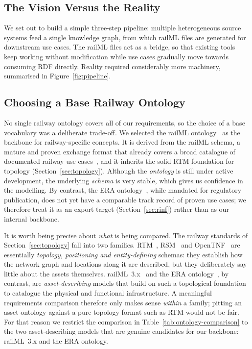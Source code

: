 \documentclass{ceurart}
\begin{document}
\subsection{The Vision Versus the Reality}

We set out to build a simple three-step pipeline: multiple heterogeneous source
systems feed a single knowledge graph, from which railML files are generated for
downstream use cases. The railML files act as a bridge, so that existing tools
keep working without modification while use cases gradually move towards
consuming RDF directly. Reality required considerably more machinery, summarised
in Figure~\ref{fig:pipeline}.

\subsection{Choosing a Base Railway Ontology}

No single railway ontology covers all of our requirements, so the choice of a
base vocabulary was a deliberate trade-off. We selected the railML
ontology~\cite{railmlontology} as the backbone for railway-specific concepts. It
is derived from the railML schema, a mature and proven exchange format that
already covers a broad catalogue of documented railway use
cases~\cite{railmlusecases}, and it inherits the solid RTM foundation for
topology (Section~\ref{sec:topology}). Although the \emph{ontology} is still
under active development, the underlying \emph{schema} is very stable, which
gives us confidence in the modelling. By contrast, the ERA
ontology~\cite{eraontology}, while mandated for regulatory publication, does not
yet have a comparable track record of proven use cases; we therefore treat it as
an export target (Section~\ref{sec:rinf}) rather than as our internal backbone.

It is worth being precise about \emph{what} is being compared. The railway
standards of Section~\ref{sec:topology} fall into two families. RTM~\cite{rtm},
RSM~\cite{rsm} and OpenTNF~\cite{opentnf} are essentially \emph{topology,
positioning and entity-defining} schemas: they establish how the network graph
and locations along it are described, but they deliberately say little about the
assets themselves. railML~3.x~\cite{railml} and the ERA
ontology~\cite{eraontology}, by contrast, are \emph{asset-describing} models that
build on such a topological foundation to catalogue the physical and functional
infrastructure. A meaningful requirements comparison therefore only makes sense
\emph{within} a family; pitting an asset ontology against a pure topology format
such as RTM would not be fair. For that reason we restrict the comparison in
Table~\ref{tab:ontology-comparison} to the two asset-describing models that are
genuine candidates for our backbone: railML~3.x and the ERA ontology.
\end{document}
